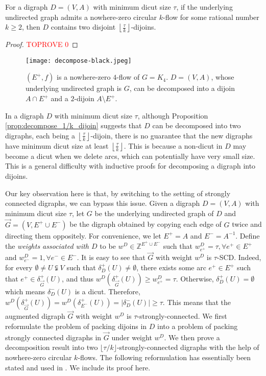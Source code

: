 \documentclass[runningheads]{llncs}
\newcommand{\rounddown}[1]{\left\lfloor#1\right\rfloor}
\newcommand{\Z}{\mathbb{Z}}
\begin{document}
\begin{proposition}\label{prop:decompose_1/k_dijoin}
    For a digraph $D=(V,A)$ with minimum dicut size $\tau$, if the underlying undirected graph admits a nowhere-zero circular $k$-flow for some rational number $k\geq 2$, then $D$ contains two disjoint $\rounddown{\frac{\tau}{k}}$-dijoins.
\end{proposition}
\begin{proof}\textcolor{red}{TOPROVE 0}\end{proof}

    \begin{figure}[htbp]
\centering
     \texttt{[image: decompose-black.jpeg]}
 \vspace{-1em}
 \caption{$(E^+,f)$ is a nowhere-zero $4$-flow of $G=K_4$. $D=(V,A)$, whose underlying undirected graph is $G$, can be decomposed into a dijoin $A\cap E^+$ and a $2$-dijoin $A\setminus E^+$.}
 \label{fig:decompose}
    \end{figure}



\bigskip
In a digraph $D$ with minimum dicut size $\tau$, although Proposition \ref{prop:decompose_1/k_dijoin} suggests that $D$ can be decomposed into two digraphs, each being a $\rounddown{\frac{\tau}{k}}$-dijoin, there is no guarantee that the new digraphs have minimum dicut size at least $\rounddown{\frac{\tau}{k}}$. This is because a non-dicut in $D$ may become a dicut when we delete arcs, which can potentially have very small size. This is a general difficulty with inductive proofs for decomposing a digraph into dijoins. 

Our key observation here is that, by switching to the setting of strongly connected digraphs, we can bypass this issue.
Given a digraph $D=(V,A)$ with minimum dicut size $\tau$, let $G$ be the underlying undirected graph of $D$ and $\vec{G}=(V,E^+\cup E^-)$ be the digraph obtained by copying each edge of $G$ twice and directing them oppositely. For convenience, we let $E^+=A$ and $E^-=A^{-1}$. 
Define the \textit{weights associated with $D$} to be $w^D\in\Z^{E^+\cup E^-}$ such that $w^D_{e^+}=\tau,\forall e^+\in E^+$ and $w^D_{e^-}=1,\forall e^-\in E^-$. 
It is easy to see that $\vec{G}$ with weight $w^D$ is $\tau$-SCD. Indeed, for every $\emptyset \neq U\subsetneqq V$ such that $\delta_{D}^+(U)\neq\emptyset$, there exists some arc $e^+\in E^+$ such that $e^+\in \delta_{\vec{G}}^+(U)$, and thus $w^D(\delta_{\vec{G}}^+(U))\geq w^D_{e^+}= \tau$. Otherwise, $\delta_{D}^+(U)=\emptyset$ which means $\delta_{D}^-(U)$ is a dicut.
Therefore, $w^D(\delta_{\vec{G}}^+(U))=w^D(\delta_{E^-}^+(U))=|\delta_{D}^-(U)|\geq \tau$. This means that the augmented digraph $\vec{G}$ with weight $w^D$ is $\tau$-strongly-connected. We first reformulate the problem of packing dijoins in $D$ into a problem of packing strongly connected digraphs in $\vec{G}$ under weight $w^D$. We  then prove a decomposition result into two $\lfloor \tau/k \rfloor$-strongly-connected digraphs with the help of nowhere-zero circular $k$-flows. The following reformulation has essentially been stated and used in \cite{shepherd2005visualizing}. We include its proof here.
\end{document}
